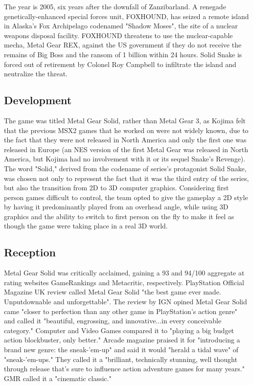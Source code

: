 \documentclass[a4paper,10pt]{book}
\begin{document}
          The year is 2005, six years after the downfall of Zanzibarland. A renegade genetically-enhanced special forces unit, FOXHOUND, has seized a remote island in Alaska's Fox Archipelago codenamed "Shadow Moses", the site of a nuclear weapons disposal facility. 
           FOXHOUND threatens to use the nuclear-capable mecha, Metal Gear REX, against the US government if they do not receive the remains of Big Boss and the ransom of 1 billion within 24 hours. Solid Snake is forced out of retirement by Colonel Roy Campbell to infiltrate the island and neutralize the threat.
         
 \subsection{Development }
 
          The game was titled Metal Gear Solid, rather than Metal Gear 3, as Kojima felt that the previous MSX2 games that he worked on were not widely known, due to the fact that they were not released in North America and only the first one was released in Europe (an NES version of the first Metal Gear was released in North America, but Kojima had no involvement with it or its sequel Snake's Revenge). The word "Solid," derived from the codename of series's protagonist Solid Snake, was chosen not only to represent the fact that it was the third entry of the series, but also the transition from 2D to 3D computer graphics. 
          Considering first person games difficult to control, the team opted to give the gameplay a 2D style by having it predominantly played from an overhead angle, while using 3D graphics and the ability to switch to first person on the fly to make it feel as though the game were taking place in a real 3D world.
         
 \subsection{Reception }
 
          Metal Gear Solid was critically acclaimed, gaining a 93 and 94/100 aggregate at rating websites GameRankings and Metacritic, respectively. 
          PlayStation Official Magazine  UK review called Metal Gear Solid "the best game ever made. Unputdownable and unforgettable". The review by IGN opined Metal Gear Solid came "closer to perfection than any other game in PlayStation's action genre" and called it "beautiful, engrossing, and innovative...in every conceivable category." 
          Computer and Video Games compared it to "playing a big budget action blockbuster, only better." Arcade magazine praised it for "introducing a brand new genre: the sneak-'em-up" and said it would "herald a tidal wave" of "sneak-'em-ups." They called it a "brilliant, technically stunning, well thought through release that's sure to influence action adventure games for many years."
          GMR called it a "cinematic classic."
         
\end{document}
